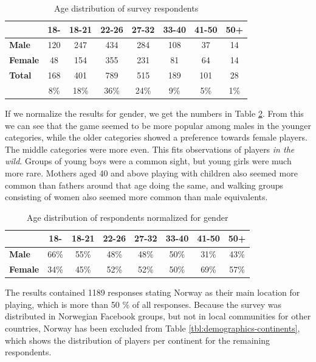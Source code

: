 \begin{table}[h]
	\centering
	\caption{Age distribution of survey respondents}
	\label{tbl:survey-age-distribution}
	\begin{tabular}{|l||c|c|c|c|c|c|c|}
		\hline
		&\textbf{18-} & \textbf{18-21} & \textbf{22-26} & \textbf{27-32} & \textbf{33-40} & \textbf{41-50} & \textbf{50+}\\
		\hline\hline
		\textbf{Male} & 120 & 247 & 434 & 284 & 108 & 37 & 14 \\
		\hline
		\textbf{Female} & 48 & 154 & 355 & 231 & 81 & 64 & 14 \\
		\hline
		\textbf{Total} & 168 & 401 & 789 & 515 & 189 & 101 & 28 \\
					& 8\% & 18\% & 36\% & 24\% & 9\% & 5\% & 1\%\\
		\hline
	\end{tabular}
\end{table}

If we normalize the results for gender, we get the numbers in Table \ref{tbl:survey-age-distribution-normalized}. From this we can see that the game seemed to be more popular among males in the younger categories, while the older categories showed a preference towards female players. The middle categories were more even. This fits observations of players \emph{in the wild}. Groups of young boys were a common sight, but young girls were much more rare. Mothers aged 40 and above playing with children also seemed more common than fathers around that age doing the same, and walking groups consisting of women also seemed more common than male equivalents.

\begin{table}[h]
	\centering
	\caption{Age distribution of respondents normalized for gender}
	\label{tbl:survey-age-distribution-normalized}
	\begin{tabular}{|l||c|c|c|c|c|c|c|}
		\hline
		&\textbf{18-} & \textbf{18-21} & \textbf{22-26} & \textbf{27-32} & \textbf{33-40} & \textbf{41-50} & \textbf{50+}\\
		\hline\hline
		\textbf{Male} & 66\% & 55\% & 48\% & 48\% & 50\% & 31\% & 43\% \\
		\hline
		\textbf{Female} & 34\% & 45\% & 52\% & 52\% & 50\% & 69\% & 57\% \\
		\hline
	\end{tabular}
\end{table}

The results contained 1189 responses stating Norway as their main location for playing, which is more than 50 \% of all responses. Because the survey was distributed in Norwegian Facebook groups, but not in local communities for other countries, Norway has been excluded from Table \ref{tbl:demographics-continents}, which shows the distribution of players per continent for the remaining respondents.

